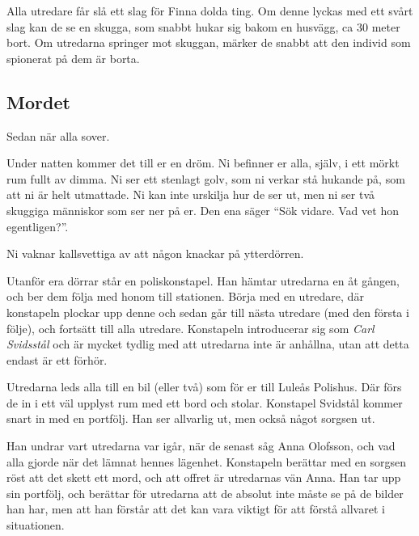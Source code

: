 Alla utredare får slå ett slag för Finna dolda ting. Om denne lyckas med ett svårt slag kan de se en skugga, som snabbt hukar sig bakom en husvägg, ca 30 meter bort. Om utredarna springer mot skuggan, märker de snabbt att den individ som spionerat på dem är borta.

\subsection{Mordet}
Sedan när alla sover.

\begin{displayquote}
	Under natten kommer det till er en dröm. Ni befinner er alla, själv, i ett mörkt rum fullt av dimma. Ni ser ett stenlagt golv, som ni verkar stå hukande på, som att ni är helt utmattade. Ni kan inte urskilja hur de ser ut, men ni ser två skuggiga människor som ser ner på er. Den ena säger ``Sök vidare. Vad vet hon egentligen?''.

	Ni vaknar kallsvettiga av att någon knackar på ytterdörren.
\end{displayquote}
%
Utanför era dörrar står en poliskonstapel. Han hämtar utredarna en åt gången, och ber dem följa med honom till stationen. Börja med en utredare, där konstapeln plockar upp denne och sedan går till nästa utredare (med den första i följe), och fortsätt till alla utredare. Konstapeln introducerar sig som \textit{Carl Svidsstål} \sectiondescribe{\ref{kar:KonstapelCarlSvidstal}} och är mycket tydlig med att utredarna inte är anhållna, utan att detta endast är ett förhör. 

Utredarna leds alla till en bil (eller två) som för er till Luleås Polishus. Där förs de in i ett väl upplyst rum med ett bord och stolar. Konstapel Svidstål kommer snart in med en portfölj. Han ser allvarlig ut, men också något sorgsen ut.

Han undrar vart utredarna var igår, när de senast såg Anna Olofsson, och vad alla gjorde när det lämnat hennes lägenhet. Konstapeln berättar med en sorgsen röst att det skett ett mord, och att offret är utredarnas vän Anna. Han tar upp sin portfölj, och berättar för utredarna att de absolut inte måste se på de bilder han har, men att han förstår att det kan vara viktigt för att förstå allvaret i situationen.

